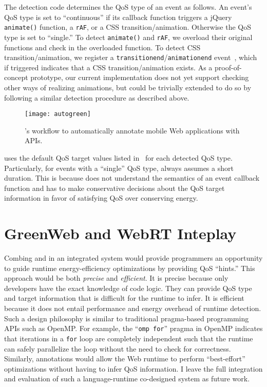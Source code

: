 The detection code determines the QoS type of an event as follows. An event's QoS type is set to ``continuous'' if its callback function triggers a jQuery \texttt{animate()} function, a \texttt{rAF}, or a CSS transition/animation. Otherwise the QoS type is set to ``single.'' To detect \texttt{animate()} and \texttt{rAF}, we overload their original functions and check in the overloaded function. To detect CSS transition/animation, we register a \texttt{transitionend}/\texttt{animationend} event~\cite{csstransitionend,cssanimationend}, which if triggered indicates that a CSS transition/animation exists. As a proof-of-concept prototype, our current implementation does not yet support checking other ways of realizing animations, but could be trivially extended to do so by following a similar detection procedure as described above.

\begin{figure}[t]
  \centering
  \texttt{[image: autogreen]}
  \caption{\autogreen's workflow to automatically annotate mobile Web applications with \greenweb APIs.}
  \label{fig:autogreen}
\end{figure}

\autogreen uses the default QoS target values listed in~ for each detected QoS type. Particularly, for events with a ``single'' QoS type, \autogreen always assumes a short duration. This is because \autogreen does not understand the semantics of an event callback function and has to make conservative decisions about the QoS target information in favor of satisfying QoS over conserving energy.

\section{GreenWeb and WebRT Inteplay}
\label{sec:lang:inter}

Combing \greenweb and \webrt in an integrated system would provide programmers an opportunity to guide runtime energy-efficiency optimizations by providing QoS ``hints.'' This approach would be both \textit{precise} and \textit{efficient}. It is precise because only developers have the exact knowledge of code logic. They can provide QoS type and target information that is difficult for the runtime to infer. It is efficient because it does not entail performance and energy overhead of runtime detection. Such a design philosophy is similar to traditional pragma-based programming APIs such as OpenMP. For example, the ``\texttt{omp for}'' pragma in OpenMP indicates that iterations in a \texttt{for} loop are completely independent such that the runtime can safely parallelize the loop without the need to check for correctness. Similarly, \greenweb annotations would allow the Web runtime to perform ``best-effort'' optimizations without having to infer QoS information. I leave the full integration and evaluation of such a language-runtime co-designed system as future work.

